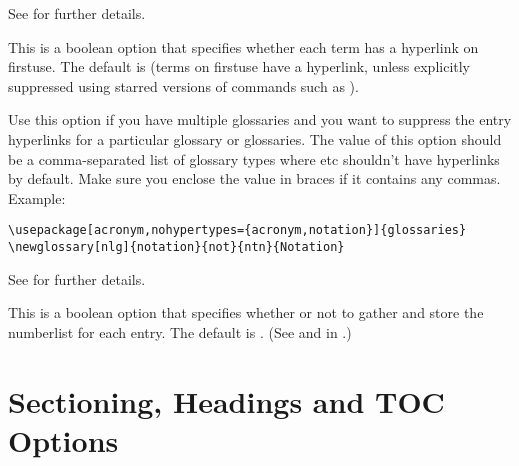 \documentclass[report]{nlctdoc}
\newcommand*{\firstuse}{\gls{firstuse}}
\begin{document}
\begin{description}
See  for further details.

\item[\pkgopt{hyperfirst}] This is a boolean option that specifies
whether each term has a hyperlink on \firstuse. The default is 
 (terms on \gls{firstuse} have a hyperlink, 
unless explicitly suppressed using starred versions of commands
such as ).

\item[\pkgopt{nohypertypes}] Use this option if you have multiple
glossaries and you want to suppress the entry hyperlinks for a
particular glossary or glossaries. The value of this option should
be a comma-separated list of glossary types where  etc
shouldn't have hyperlinks by default. Make sure you enclose the
value in braces if it contains any commas. Example:
\begin{verbatim}
\usepackage[acronym,nohypertypes={acronym,notation}]{glossaries}
\newglossary[nlg]{notation}{not}{ntn}{Notation}
\end{verbatim}
See  for further details.

\item[\pkgopt{savenumberlist}] This is a boolean option that
specifies whether or not to gather and store the \gls{numberlist}
for each entry. The default is . (See
 and  in
.)

\end{description}

\section{Sectioning, Headings and TOC Options}
\label{sec:pkgopts-sec}
\end{document}
